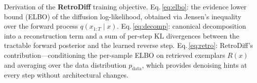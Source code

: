 \caption{Derivation of the \textbf{RetroDiff} training objective.
Eq.\,\eqref{eq:elbo}: the evidence lower bound (ELBO) of the diffusion log-likelihood,
obtained via Jensen's inequality over the forward process $q(x_{1:T}\!\mid\!x)$.
Eq.\,\eqref{eq:decomp}: canonical decomposition into a reconstruction term and a
sum of per-step KL divergences between the tractable forward posterior and the
learned reverse step.
Eq.\,\eqref{eq:retro}: RetroDiff's contribution---conditioning the per-sample ELBO
on retrieved exemplars $R(x)$ and averaging over the data distribution
$p_{\mathrm{data}}$, which provides denoising hints at every step without
architectural changes.}
